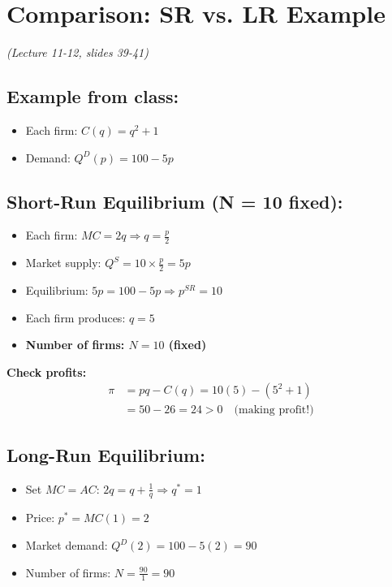 \documentclass[11pt]{article}
\begin{document}
\newpage

\section{Comparison: SR vs. LR Example}
\textit{(Lecture 11-12, slides 39-41)}

\subsection*{Example from class:}
\begin{itemize}
    \item Each firm: $C(q) = q^2 + 1$
    \item Demand: $Q^D(p) = 100 - 5p$
\end{itemize}

\subsection*{Short-Run Equilibrium (N = 10 fixed):}

\begin{itemize}[leftmargin=*]
    \item Each firm: $MC = 2q \Rightarrow q = \frac{p}{2}$
    \item Market supply: $Q^S = 10 \times \frac{p}{2} = 5p$
    \item Equilibrium: $5p = 100 - 5p \Rightarrow p^{SR} = 10$
    \item Each firm produces: $q = 5$
    \item \textbf{Number of firms: $N = 10$ (fixed)}
\end{itemize}

\textbf{Check profits:}
\begin{align*}
\pi &= pq - C(q) = 10(5) - (5^2 + 1) \\
&= 50 - 26 = 24 > 0 \quad \text{(making profit!)}
\end{align*}

\subsection*{Long-Run Equilibrium:}

\begin{itemize}[leftmargin=*]
    \item Set $MC = AC$: $2q = q + \frac{1}{q} \Rightarrow q^* = 1$
    \item Price: $p^* = MC(1) = 2$
    \item Market demand: $Q^D(2) = 100 - 5(2) = 90$
    \item Number of firms: $N = \frac{90}{1} = 90$
\end{itemize}
\end{document}
